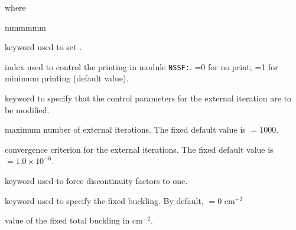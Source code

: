 \noindent where
\begin{ListeDeDescription}{mmmmmm}

\item[\moc{EDIT}] keyword used to set .

\item[\dusa{iprint}] index used to control the printing  in module {\tt NSSF:}.
=0 for no print; =1 for minimum printing (default value).

\item[\moc{EXTE}] keyword to specify that the control parameters for the
external iteration are to be modified. 

\item[\dusa{maxout}] maximum number of external iterations. The fixed default
value is  $=1000$.

\item[\dusa{epsout}] convergence criterion for the external iterations. The
fixed default value is  $=1.0\times 10^{-6}$.

\item[\moc{NODF}] keyword used to force discontinuity factors to one.

\item[\moc{BUCK}] keyword used to specify the fixed buckling. By default,
 $=0$ cm$^{-2}$

\item[\dusa{valb2}] value of the fixed total buckling in cm$^{-2}$.

\end{ListeDeDescription}

\clearpage
